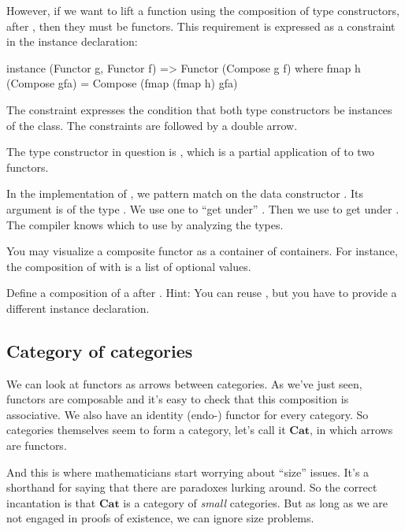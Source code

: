 \documentclass[DaoFP]{subfiles}
\begin{document}
However, if we want to lift a function using the composition of type constructors,  after , then they must be functors. This requirement is expressed as a constraint in the instance declaration:
\begin{haskell}
instance (Functor g, Functor f) => Functor (Compose g f) where
  fmap h (Compose gfa) = Compose (fmap (fmap h) gfa)
\end{haskell}
The constraint  expresses the condition that both type constructors be instances of the  class. The constraints are followed by a double arrow. 

The type constructor in question is , which is a partial application of  to two functors. 

In the implementation of , we pattern match on the data constructor . Its argument  is of the type . We use one  to ``get under'' . Then we use  to get under . The compiler knows which  to use by analyzing the types. 

You may visualize a composite functor as a container of containers. For instance, the composition of \hask{[]} with  is a list of optional values. 

\begin{exercise}
Define a composition of a  after . Hint: You can reuse , but you have to provide a different instance declaration.
\end{exercise}


\subsection{Category of categories}

We can look at functors as arrows between categories. As we've just seen, functors are composable and it's easy to check that this composition is associative. We also have an identity (endo-) functor for every category. So categories themselves seem to form a category, let's call it $\mathbf{Cat}$, in which arrows are functors. 

And this is where mathematicians start worrying about ``size'' issues. It's a shorthand for saying that there are paradoxes lurking around. So the correct incantation is that $\mathbf{Cat}$ is a category of \emph{small} categories. But as long as we are not engaged in proofs of existence, we can ignore size problems.
\end{document}
